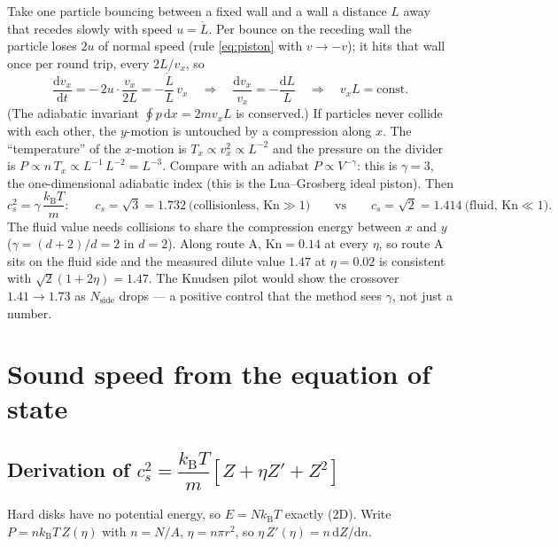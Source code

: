 \documentclass[11pt,a4paper]{article}
\newcommand{\kT}{k_{\mathrm B}T}
\newcommand{\dd}{\mathrm{d}}
\begin{document}
Take one particle bouncing between a fixed wall and a wall a distance $L$ away that recedes slowly with speed $u = \dot L$. Per bounce on the receding wall the particle loses $2u$ of normal speed (rule \eqref{eq:piston} with $v \to -v$); it hits that wall once per round trip, every $2L/v_x$, so
\begin{equation}
\frac{\dd v_x}{\dd t} = -\,2u\cdot\frac{v_x}{2L} = -\frac{\dot L}{L}\,v_x
\quad\Longrightarrow\quad
\frac{\dd v_x}{v_x} = -\frac{\dd L}{L}
\quad\Longrightarrow\quad v_x L = \text{const}.
\end{equation}
(The adiabatic invariant $\oint p\,\dd x = 2 m v_x L$ is conserved.) If particles never collide with each other, the $y$-motion is untouched by a compression along $x$. The ``temperature'' of the $x$-motion is $T_x \propto v_x^2 \propto L^{-2}$ and the pressure on the divider is $P \propto n\,T_x \propto L^{-1}\,L^{-2} = L^{-3}$. Compare with an adiabat $P \propto V^{-\gamma}$: this is $\gamma = 3$, the one-dimensional adiabatic index (this is the Lua--Grosberg ideal piston). Then
\begin{equation}
c_s^2 = \gamma\,\frac{\kT}{m}:\qquad
c_s = \sqrt3 = 1.732\ \text{(collisionless, }\mathrm{Kn}\gg1)
\qquad\text{vs}\qquad
c_s = \sqrt2 = 1.414\ \text{(fluid, }\mathrm{Kn}\ll1).
\end{equation}
The fluid value needs collisions to share the compression energy between $x$ and $y$ ($\gamma = (d+2)/d = 2$ in $d = 2$). Along route A, $\mathrm{Kn} = 0.14$ at every $\eta$, so route A sits on the fluid side and the measured dilute value $1.47$ at $\eta = 0.02$ is consistent with $\sqrt2(1+2\eta) = 1.47$. The Knudsen pilot would show the crossover $1.41 \to 1.73$ as $N_{\mathrm{side}}$ drops --- a positive control that the method sees $\gamma$, not just a number.

\section{Sound speed from the equation of state}

\subsection{Derivation of \texorpdfstring{$c_s^2 = \dfrac{\kT}{m}\left[Z + \eta Z' + Z^2\right]$}{the adiabatic mapping}}
Hard disks have no potential energy, so $E = N\kT$ exactly (2D). Write $P = n\kT\,Z(\eta)$ with $n = N/A$, $\eta = n\pi r^2$, so $\eta\, Z'(\eta) = n\,\dd Z/\dd n$.
\end{document}

